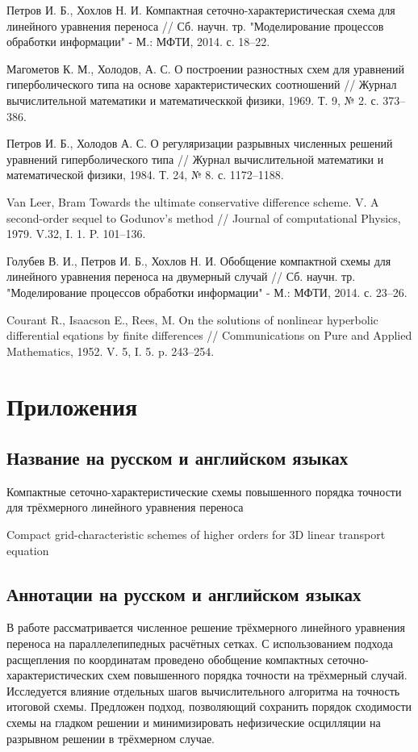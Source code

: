 \documentclass[11pt]{article}
\begin{document}
\begin{thebibliography}{99}
Петров И. Б., Хохлов Н. И. Компактная сеточно-характеристическая схема для линейного уравнения переноса // Сб. научн. тр. "Моделирование процессов обработки информации" - М.: МФТИ, 2014. с. 18--22.

Магометов К. М., Холодов, А. С. О построении разностных схем для уравнений гиперболического типа на основе характеристических соотношений // Журнал вычислительной математики и математическкой физики, 1969. Т. 9, № 2. с. 373--386.

Петров И. Б., Холодов А. С. О регуляризации разрывных численных решений уравнений гиперболического типа // Журнал вычислительной математики и математической физики, 1984. Т. 24, № 8. с. 1172--1188.

Van Leer, Bram Towards the ultimate conservative difference scheme. V. A second-order sequel to Godunov's method // Journal of computational Physics, 1979. V.32, I. 1. P. 101--136.

Голубев В. И., Петров И. Б., Хохлов Н. И. Обобщение компактной схемы для линейного уравнения переноса на двумерный случай // Сб. научн. тр. "Моделирование процессов обработки информации" - М.: МФТИ, 2014. с. 23--26.

Courant R., Isaacson E., Rees, M. On the solutions of nonlinear hyperbolic differential eqations by finite differences // Communications on Pure and Applied Mathematics, 1952. V. 5, I. 5. p. 243--254.

\end{thebibliography}

\section {Приложения}

\subsection {Название на русском и английском языках}

Компактные сеточно-характеристические схемы повышенного порядка точности для трёхмерного линейного уравнения переноса

Compact grid-characteristic schemes of higher orders for 3D linear transport equation

\subsection {Аннотации на русском и английском языках}
В работе рассматривается численное решение трёхмерного линейного уравнения переноса на параллелепипедных расчётных сетках.
С использованием подхода расщепления по координатам проведено обобщение компактных сеточно-характеристических схем повышенного порядка точности на трёхмерный случай.
Исследуется влияние отдельных шагов вычислительного алгоритма на точность итоговой схемы.
Предложен подход, позволяющий сохранить порядок сходимости схемы на гладком решении и минимизировать нефизические осцилляции на разрывном решении в трёхмерном случае.
\end{document}
